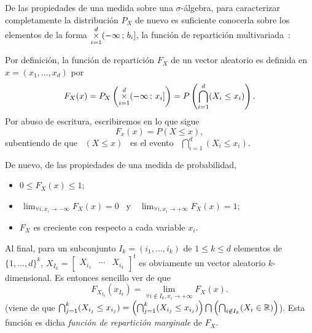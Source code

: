 De las propiedades de una medida sobre una $\sigma$-\'algebra, para caracterizar
completamente la distribuci\'on $P_X$ de nuevo es suficiente conocerla sobre los
elementos de  la forma $\displaystyle  \operatorname*{\times}_{i=1}^d (-\infty \, ;  \, b_i]$,
\ie  la funci\'on  de repartici\'on  multivariada~\cite{AthLah06,  Coh13, Bre88,
  HogMck13}:
%
\begin{definicion}
\label{Def:MP:FuncionReparticionMultivariada}
%
  Por  definici\'on,  la  funci\'on  de  repartici\'on  $F_X$  de  un vector
  aleatorio es definida en $x = (x_1 , \ldots , x_d)$ por
  \[
  F_X(x) =  P_X\left( \operatorname*{\times}_{i=1}^d (-\infty \,  ; \, x_i]  \right) = P\left(
    \bigcap_{i=1}^d (X_i \le x_i) \right).
  \]
  Por abuso de escritura, escribiremos en lo que sigue
  \[
  F_x(x) = P(X \le x),
  \]
  subentiendo  de  que   \  $(X  \le  x)$  \  es   el  evento  \  $\displaystyle
  \bigcap_{i=1}^d (X_i \le x_i)$.
\end{definicion}
%
De nuevo, de las propiedades de una medida de probabilidad,
%
\begin{itemize}
\item $0 \le F_X(x) \le 1$;
%
\item $\displaystyle  \, \lim_{\forall  i, x_i \to  -\infty} F_X(x)  = 0$ \  y \
  $\displaystyle \, \lim_{\forall i, x_i \to +\infty} F_X(x) = 1$;
%
\item $F_X$ es creciente con respecto a cada variable $x_i$.
\end{itemize}
%
Al  final, para  un subconjunto  $I_k =  (i_1,\ldots,i_k)$ de  $1 \le  k  \le d$
elementos de  $\{ 1  , \ldots ,  d \}^k$,  $X_{I_k} = \begin{bmatrix}  X_{i_1} &
  \cdots   &   X_{i_k}\end{bmatrix}^t$  es   obviamente   un  vector   aleatorio
$k$-dimensional. Es entonces sencillo ver de que
%
\[
F_{X_{I_k}}(x_{I_k}) = \lim_{\forall i \not\in I_k, x_i \to +\infty} F_X(x).
\label{Pagina:MP:MarginalesF}
\]
%
(viene de  que $\bigcap_{j=1}^k (X_{i_j}  \le x_{i_j}) =  \left( \bigcap_{j=1}^k
  (X_{i_j} \le x_{i_j}) \right) \bigcap  \left( \bigcap_{i \not\in I_k} (X_i \in
  \mathbb{R})  \right)$). Esta  funci\'on es  dicha {\it  funci\'on  de repartici\'on
  marginale} de $F_X$.

